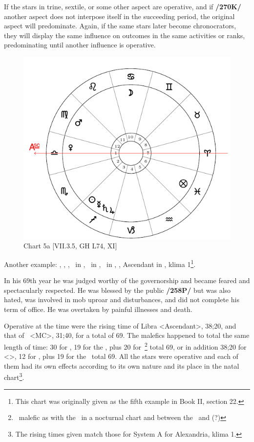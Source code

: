 If \mndl the stars in trine, sextile, or some other aspect are operative, and if \textbf{/270K/} another aspect does not interpose itself in the succeeding period, the original aspect will predominate. Again, if the same stars later become chronocrators, they will display the same influence on outcomes in the same activities or ranks, predominating until another influence is operative.

\newpage
\begin{figure}
\centering
\includegraphics[width=.68\textwidth]{charts/7_3_6}
\caption{Chart 5a [VII.3.5, GH L74, XI]}
\label{fig:chart5a}
\end{figure} 

Another example: \Sun, \Saturn, \Jupiter, \Mercury\, in \Sagittarius, \Moon\, in \Cancer, \Mars\, in \Virgo,
\Venus, Ascendant in \Libra, klima 1\footnote{This chart was originally given as the fifth example in Book II, section 22.}.

In his 69th year he was judged worthy of the governorship and became feared and spectacularly respected. He was blessed by the public \textbf{/258P/} but was also hated, was involved in mob uproar and disturbances, and did not complete his term of office. He was overtaken by painful illnesses and death. 

Operative at the time were the rising time of Libra <Ascendant>, 38;20, and that of \Cancer\, <MC>, 31;40, for a total of 69. The malefics happened to total the same length of time: 30 for \Saturn, 19 for the \Sun, plus 20 for \Mercury\,\footnote{\Mercury\, malefic as with the \Sun\, in a nocturnal chart and between the \Sun\, and \Saturn (?)} total 69, or in addition 38;20 for \Virgo <\Mars>, 12 for \Jupiter, plus 19 for the \Sun\, total 69. All the stars were operative and each of them had its own effects according to its own nature and its place in the natal chart\footnote{The rising times given match those for System A for Alexandria, klima 1.}.

